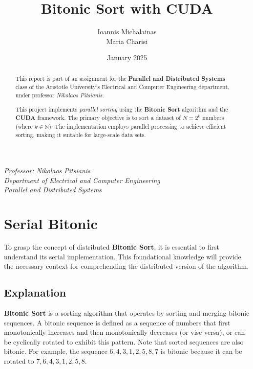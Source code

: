 \documentclass[12pt]{report}
\title{\textbf{Bitonic Sort with CUDA}}
\author{Ioannis Michalainas\\Maria Charisi}
\date{January 2025}
\begin{document}
\maketitle

\begin{abstract}
This report is part of an assignment for the \textbf{Parallel and Distributed Systems} class of the
Aristotle University's Electrical and Computer Engineering department, under professor \textit{Nikolaos Pitsianis}.

This project implements \textit{parallel sorting} using the \textbf{Bitonic Sort} algorithm and the \textbf{CUDA} framework. The primary objective is to sort a dataset of $N = 2^k$ numbers (where $k \in \mathbb{N}$). The implementation employs parallel processing to achieve efficient sorting, making it suitable for large-scale data sets.
\end{abstract}

\tableofcontents

\vfill
\begin{center}
    \textit{Professor: Nikolaos Pitsianis\\
    Department of Electrical and Computer Engineering\\
    Parallel and Distributed Systems}
\end{center}
\newpage

\chapter{Serial Bitonic}

To grasp the concept of distributed \textbf{Bitonic Sort}, it is essential to first understand its serial implementation. This foundational knowledge will provide the necessary context for comprehending the distributed version of the algorithm.

\section{Explanation}

\textbf{Bitonic Sort} is a sorting algorithm that operates by sorting and merging bitonic sequences. A bitonic sequence is defined as a sequence of numbers that first monotonically increases and then monotonically decreases (or vise versa), or can be cyclically rotated to exhibit this pattern. Note that sorted sequences are also bitonic. For example, the sequence $6, 4, 3, 1, 2, 5, 8, 7$ is bitonic because it can be rotated to $7, 6, 4, 3, 1, 2, 5, 8$. 
\end{document}
